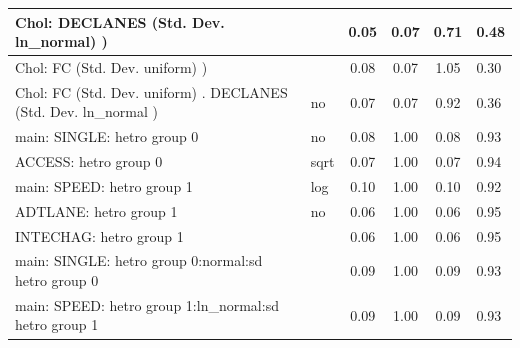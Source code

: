 \begin{table}
\begin{center}
\begin{tabular}{|l|l|c|c|c|l|}
			 Chol: DECLANES (Std. Dev. ln_normal) ) &  & 0.05 & 0.07 & 0.71 & 0.48 \\
			\hline
			 Chol: FC (Std. Dev. uniform) ) &  & 0.08 & 0.07 & 1.05 & 0.30 \\
			\hline
			 Chol: FC (Std. Dev. uniform) . DECLANES (Std. Dev.   ln_normal ) & no & 0.07 & 0.07 & 0.92 & 0.36 \\
			\hline
			main: SINGLE: hetro group 0 & no & 0.08 & 1.00 & 0.08 & 0.93 \\
			\hline
			ACCESS: hetro group 0 & sqrt & 0.07 & 1.00 & 0.07 & 0.94 \\
			\hline
			main: SPEED: hetro group 1 & log & 0.10 & 1.00 & 0.10 & 0.92 \\
			\hline
			ADTLANE: hetro group 1 & no & 0.06 & 1.00 & 0.06 & 0.95 \\
			\hline
			INTECHAG: hetro group 1 &  & 0.06 & 1.00 & 0.06 & 0.95 \\
			\hline
			main: SINGLE: hetro group 0:normal:sd  hetro group 0 &  & 0.09 & 1.00 & 0.09 & 0.93 \\
			\hline
			main: SPEED: hetro group 1:ln_normal:sd  hetro group 1 &  & 0.09 & 1.00 & 0.09 & 0.93 \\
			\hline
		\end{tabular}
	\end{center}
\end{table}
